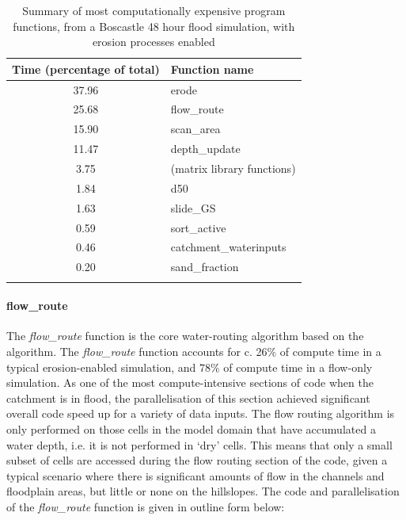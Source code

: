 \begin{table}
\caption{Summary of most computationally expensive program functions, from a Boscastle 48 hour flood simulation, with erosion processes enabled}
\begin{tabular}{cl}

\textbf{Time} (percentage of total) & \textbf{Function name} \\
\hline 
37.96                                    & erode \\
25.68                                     & flow\_route \\
15.90                                       & scan\_area \\
11.47                                      & depth\_update \\
3.75                                    & (matrix library functions) \\
1.84                                       & d50 \\
1.63                                       & slide\_GS \\
0.59                                      & sort\_active \\
0.46                                      & catchment\_waterinputs \\
0.20                                     & sand\_fraction \\
\hline \\
\end{tabular} 
\label{profile_speed_up_erode}
\end{table}


\paragraph*{flow\_route}
The \textit{flow\_route} function is the core water-routing algorithm based on the \citet{bates2010simple} algorithm. The \textit{flow\_route} function accounts for c. 26\% of compute time in a typical erosion-enabled simulation, and 78\% of compute time in a flow-only simulation.  As one of the most compute-intensive sections of code when the catchment is in flood, the parallelisation of this section achieved significant overall code speed up for a variety of data inputs. The flow routing algorithm is only performed on those cells in the model domain that have accumulated a water depth, i.e. it is not performed in `dry' cells. This means that only a small subset of cells are accessed during the flow routing section of the code, given a typical scenario where there is significant amounts of flow in the channels and floodplain areas, but little or none on the hillslopes. The code and parallelisation of the \textit{flow\_route} function is given in outline form below:

